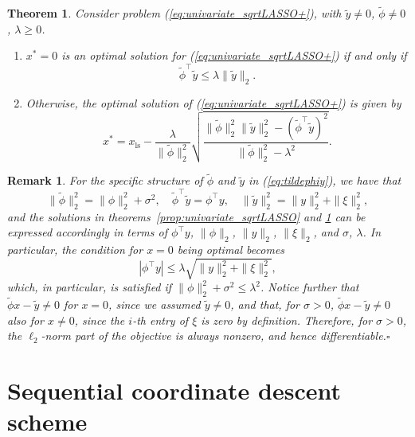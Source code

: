 \documentclass[11pt]{article}
\newcommand{\tran}{^{\top}}
\newcommand{\qed}{{\hfill $\square$}}
\newcommand{\lam}{\lambda}
\newcommand{\beq}{\begin{equation}}
\newcommand{\eeq}{\end{equation}}
\newcommand{\ben}{\begin{enumerate}}
\newcommand{\een}{\end{enumerate}}
\newcommand{\ped}[1]{{_{\mathrm{#1}}}}
\newtheorem{theorem}{Theorem}
\newtheorem{remark}{Remark}
\begin{document}
\begin{theorem} 
\label{prop:univariate_sqrtLASSO+}
Consider problem (\ref{eq:univariate_sqrtLASSO+}), with $\tilde y\neq 0$, $\tilde \phi\neq 0$, $\lam\geq 0$.
\ben
\item $x^* = 0$ is an optimal solution for (\ref{eq:univariate_sqrtLASSO+}) if and only if
\[
\tilde \phi\tran \tilde y \leq \lam \|\tilde y\|_2.
\]
\item Otherwise, the optimal solution of (\ref{eq:univariate_sqrtLASSO+}) is given by
\beq
x^* = x\ped{ls} - \frac{\lam}{\|\tilde \phi\|_2^2}\sqrt{\frac{
\| \tilde \phi\|_2^2 \| \tilde y \|_2^2 - (\tilde  \phi\tran \tilde y )^2}
{\|\tilde \phi\|_2^2  -\lam^2 }}
.
\label{eq:univariate_sqrtLASSO+_nzsol}
\eeq
\een
\end{theorem}



\begin{remark}\rm
For the specific structure of $\tilde\phi$ and $\tilde y$ in (\ref{eq:tildephiy}), we have that
\[
\|\tilde \phi\|_2^2=\|\phi\|_2^2+\sigma^2, \quad \tilde \phi\tran \tilde y = \phi\tran y, \quad
\|\tilde y \|_2^2 = \|y \|_2^2 + \|\xi\|_2^2,
\]
and the solutions in theorems~\ref{prop:univariate_sqrtLASSO} and \ref{prop:univariate_sqrtLASSO+} can be expressed accordingly in terms of
$\phi\tran y$, 
$\|\phi\|_2$, $\|y \|_2$,  $\|\xi\|_2$, and $\sigma$, $\lam$.
In particular, the condition for $x=0$ being optimal becomes
\[
|\phi\tran y| \leq \lam \sqrt{\|y\|_2^2 + \|\xi\|_2^2},
\]
which, in particular, is satisfied if $\|\phi\|_2^2+\sigma^2\leq \lam^2$.\newline 
 Notice further that $\tilde\phi x - \tilde y\neq 0$  for $x=0$, since we assumed $\tilde y \neq 0$, and that,
 for $\sigma>0$, $\tilde\phi x - \tilde y\neq 0$ also for $x\neq 0$, since the $i$-th entry of $\xi$ is zero by definition.
Therefore, for $\sigma>0$, the $\ell_2$-norm part of the objective is always nonzero, and hence differentiable.\qed
\end{remark}



\section{Sequential coordinate descent scheme}
\label{sec:cd}
\end{document}
